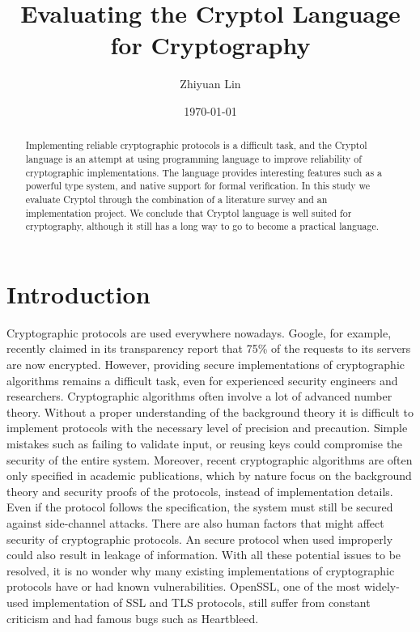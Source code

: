\documentclass[a4paper, notitlepage]{report}
\title{Evaluating the Cryptol Language for Cryptography}
\author{Zhiyuan Lin}
\date{\today}
\begin{document}
\maketitle
\begin{abstract}

  Implementing reliable cryptographic protocols is a difficult task, and
  the Cryptol language is an attempt at using programming language to
  improve reliability of cryptographic implementations. The language
  provides interesting features such as a powerful type system, and
  native support for formal verification. In this study we evaluate
  Cryptol through the combination of a literature survey and an implementation
  project. We conclude that Cryptol language is well suited for
  cryptography, although it still has a long way to go to become a practical
  language. 
  
\end{abstract}

\newpage

\tableofcontents

\newpage


\chapter{Introduction}

Cryptographic protocols are used everywhere nowadays. Google, for example,
recently claimed in its transparency report that 75\% of the requests to
its servers are now encrypted.
However, providing secure implementations of cryptographic algorithms
remains a difficult task, even for experienced security engineers and
researchers.
Cryptographic algorithms often involve a lot of advanced number theory.
Without a proper understanding of the background theory it is difficult to implement
protocols with the necessary level of precision and precaution.
Simple mistakes such as failing to validate input, or reusing keys could
compromise the security of the entire system.
Moreover, recent cryptographic algorithms are often only specified in
academic publications, which by nature focus on the background theory and security
proofs of the protocols, instead of implementation details.
Even if the protocol follows the specification, the system must still be secured
against side-channel attacks.
There are also human factors that might affect security of cryptographic protocols.
An secure protocol when used improperly could also result in leakage of information.
With all these potential issues to be resolved, it is no wonder why
many existing implementations of cryptographic protocols have or had known
vulnerabilities.
OpenSSL, one of the most widely-used implementation of SSL and
TLS protocols, still suffer from constant criticism and had famous bugs such as
Heartbleed.
\end{document}
